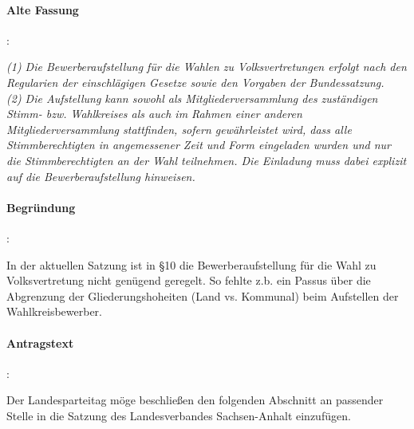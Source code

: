 \paragraph{Alte Fassung}:

\textit{(1) Die Bewerberaufstellung für die Wahlen zu Volksvertretungen erfolgt nach den Regularien der einschlägigen Gesetze sowie den Vorgaben der Bundessatzung.\\
(2) Die Aufstellung kann sowohl als Mitgliederversammlung des zuständigen Stimm- bzw. Wahlkreises als auch im Rahmen einer anderen Mitgliederversammlung stattfinden, sofern gewährleistet wird, dass alle Stimmberechtigten in angemessener Zeit und Form eingeladen wurden und nur die Stimmberechtigten an der Wahl teilnehmen. Die Einladung muss dabei explizit auf die Bewerberaufstellung hinweisen.}

\paragraph{Begründung}:

In der aktuellen Satzung ist in §10 die Bewerberaufstellung für die Wahl zu Volksvertretung nicht genügend geregelt. So fehlte z.b. ein Passus über die Abgrenzung der Gliederungshoheiten (Land vs. Kommunal) beim Aufstellen der Wahlkreisbewerber.



\paragraph{Antragstext}:

Der Landesparteitag möge beschließen den folgenden Abschnitt an passender Stelle in die Satzung des Landesverbandes Sachsen-Anhalt einzufügen.

